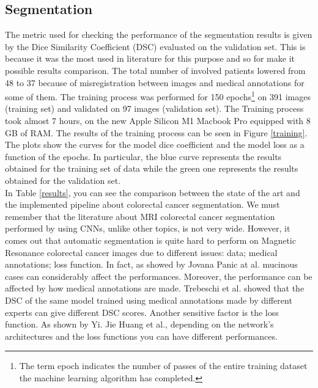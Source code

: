 \documentclass{standalone}
\begin{document}
\subsection{Segmentation}

The metric used for checking the performance of the segmentation results is given by the Dice Similarity Coefficient (DSC) evaluated on the validation set.
This is because it was the most used in literature for this purpose and so for make it possible results comparison.
The total number of involved patients lowered from 48 to 37 because of misregistration between images and medical annotations for some of them.
The training process was performed for 150 epochs\footnote{The term epoch indicates the number of passes of the entire training dataset the machine learning algorithm has completed.} on 391 images (training set) and validated on 97 images (validation set).
The Training process took almost 7 hours, on the new Apple Silicon M1 Macbook Pro equipped with 8 GB of RAM.
The results of the training process can be seen in Figure \ref{training}.
The plots show the curves for the model dice coefficient and the model loss as a function of the epochs.
In particular, the blue curve represents the results obtained for the training set of data while the green one represents the results obtained for the validation set.
\\
In Table \ref{results}, you can see the comparison between the state of the art and the implemented pipeline about colorectal cancer segmentation.
We must remember that the literature about MRI colorectal cancer segmentation performed by using CNNs, unlike other topics, is not very wide.
However, it comes out that automatic segmentation is quite hard to perform on Magnetic Resonance colorectal cancer images due to different issues: data; medical annotations; loss function.
In fact, as showed by Jovana Panic at al.\cite{jpanic} mucinous cases can considerably affect the performances.
Moreover, the performance can be affected by how medical annotations are made.
Trebeschi et al. \cite{Trebeschi2017} showed that the DSC of the same model trained using medical annotations made by different experts can give different DSC scores.
Another sensitive factor is the loss function. 
As shown by Yi. Jie Huang et al.\cite{YiJieHuang}, depending on the network's architectures and the loss functions you can have different performances. 
 
\end{document}

